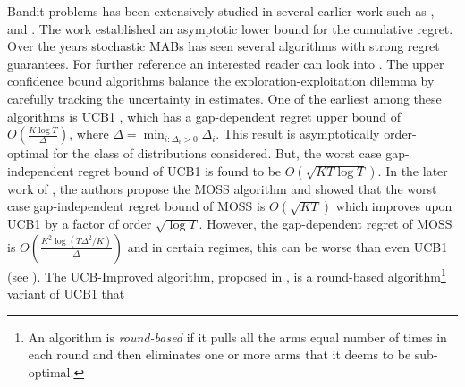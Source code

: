 
	Bandit problems has been extensively studied in several earlier work such as \citet{thompson1933likelihood}, \citet{robbins1952some} and \citet{lai1985asymptotically}. The \citet{lai1985asymptotically} work established an asymptotic lower bound for the cumulative regret. Over the years stochastic MABs has seen several algorithms with strong regret guarantees. For  further reference an interested reader can look into \citet{bubeck2012bandits}. The upper confidence bound algorithms balance the exploration-exploitation dilemma by carefully tracking the uncertainty in estimates. One of the earliest among these algorithms is UCB1 \citep{auer2002finite}, which has a gap-dependent regret upper bound of  $O\left(\frac{K\log T}{\Delta}\right)$, where $\Delta = \min_{i:\Delta_i>0} \Delta_i$. This result is asymptotically order-optimal for the class of distributions considered. But, the worst case gap-independent regret bound of UCB1 is found to be  $O \left(\sqrt{KT\log T}\right)$. In the later work of \citet{audibert2009minimax}, the authors propose the MOSS algorithm and showed that the worst case gap-independent regret bound of MOSS is $O\left( \sqrt{KT} \right)$ which improves upon UCB1 by a factor of order $\sqrt{\log T}$. However, the gap-dependent regret of MOSS is $O\left( \frac{K^{2}\log\left(T\Delta^{2}/K\right)}{\Delta}\right)$ and in certain regimes, this can be worse than even UCB1 (see \citet{audibert2009minimax,lattimore2015optimally}). The UCB-Improved algorithm, proposed in \citet{auer2010ucb}, is a round-based algorithm\footnote{An algorithm is \textit{round-based} if it pulls all the arms equal number of times in each round and then eliminates one or more arms that it deems  to be sub-optimal.} variant of UCB1 that 
